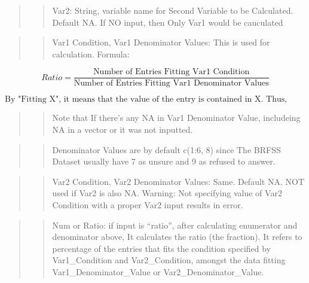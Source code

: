\documentclass[
]{article}
\begin{document}
\begin{quote}
\begin{quote}
Var2: String, variable name for Second Variable to be Calculated.
Default NA. If NO input, then Only Var1 would be cauculated
\end{quote}
\end{quote}

\begin{quote}
\begin{quote}
Var1 Condition, Var1 Denominator Values: This is used for calculation.
Formula:
\end{quote}
\end{quote}

\begin{center}
$$Ratio = \displaystyle\frac{\text{Number of Entries Fitting Var1 Condition}}{\text{Number of Entries Fitting Var1 Denominator Values}}$$

$$\text{By "Fitting X", it means that the value of the entry is contained in X. Thus, These conditions can be a vector.}$$
\end{center}

\begin{quote}
\begin{quote}
Note that If there's any NA in Var1 Denominator Value, includeing NA in
a vector or it was not inputted.
\end{quote}
\end{quote}

\begin{quote}
\begin{quote}
Denominator Values are by default c(1:6, 8) since The BRFSS Dataset
usually have 7 as unsure and 9 as refused to answer.
\end{quote}
\end{quote}

\begin{quote}
\begin{quote}
Var2 Condition, Var2 Denominator Values: Same. Default NA. NOT used if
Var2 is also NA. Warning: Not specifying value of Var2 Condition with a
proper Var2 input results in error.
\end{quote}
\end{quote}

\begin{quote}
\begin{quote}
Num or Ratio: if input is ``ratio'', after calculating enumerator and
denominator above, It calculates the ratio (the fraction). It refers to
percentage of the entries that fits the condition specified by
Var1\_Condition and Var2\_Condition, amongst the data fitting
Var1\_Denominator\_Value or Var2\_Denominator\_Value.
\end{quote}
\end{quote}
\end{document}
